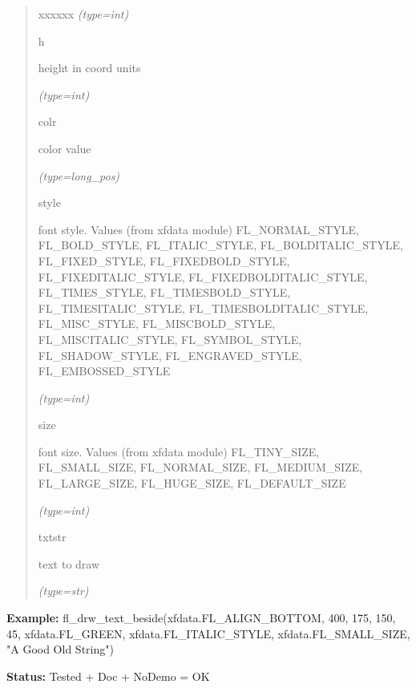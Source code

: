 \begin{boxedminipage}{\funcwidth}
\begin{quote}
\begin{Ventry}{xxxxxx}
            {\it (type=int)}

          \item[h]

          height in coord units

            {\it (type=int)}

          \item[colr]

          color value

            {\it (type=long\_pos)}

          \item[style]

          font style. Values (from xfdata module) FL\_NORMAL\_STYLE, 
          FL\_BOLD\_STYLE, FL\_ITALIC\_STYLE, FL\_BOLDITALIC\_STYLE, 
          FL\_FIXED\_STYLE, FL\_FIXEDBOLD\_STYLE, FL\_FIXEDITALIC\_STYLE, 
          FL\_FIXEDBOLDITALIC\_STYLE, FL\_TIMES\_STYLE, 
          FL\_TIMESBOLD\_STYLE, FL\_TIMESITALIC\_STYLE, 
          FL\_TIMESBOLDITALIC\_STYLE, FL\_MISC\_STYLE, FL\_MISCBOLD\_STYLE,
          FL\_MISCITALIC\_STYLE, FL\_SYMBOL\_STYLE, FL\_SHADOW\_STYLE, 
          FL\_ENGRAVED\_STYLE, FL\_EMBOSSED\_STYLE

            {\it (type=int)}

          \item[size]

          font size. Values (from xfdata module) FL\_TINY\_SIZE, 
          FL\_SMALL\_SIZE, FL\_NORMAL\_SIZE, FL\_MEDIUM\_SIZE, 
          FL\_LARGE\_SIZE, FL\_HUGE\_SIZE, FL\_DEFAULT\_SIZE

            {\it (type=int)}

          \item[txtstr]

          text to draw

            {\it (type=str)}

        \end{Ventry}

      \end{quote}

\textbf{Example:} fl\_drw\_text\_beside(xfdata.FL\_ALIGN\_BOTTOM, 400, 175, 150, 45, 
xfdata.FL\_GREEN, xfdata.FL\_ITALIC\_STYLE, xfdata.FL\_SMALL\_SIZE, "A Good
Old String")



\textbf{Status:} Tested + Doc + NoDemo = OK



    \end{boxedminipage}

